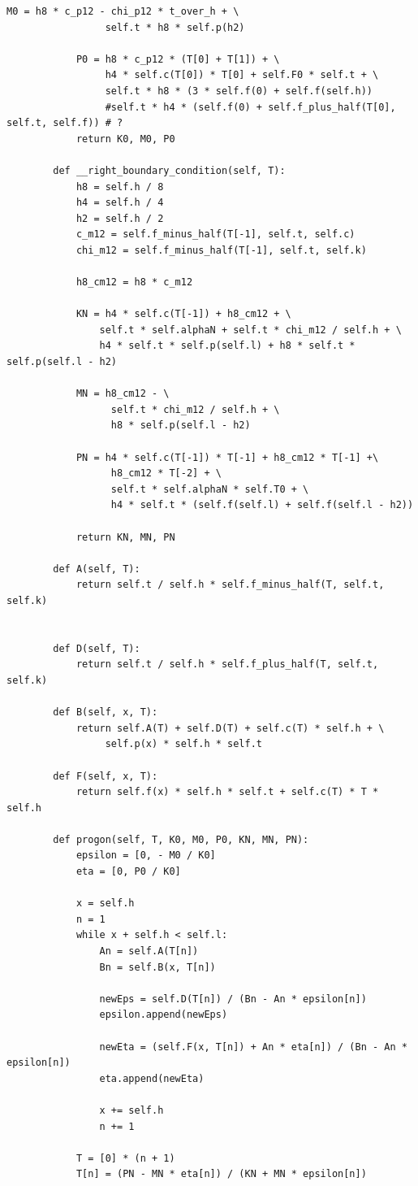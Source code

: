 \documentclass[a4paper,14pt]{article}
\begin{document}
\begin{lstlisting}[label=code1,caption=\text{Класс Modeller.}]
			M0 = h8 * c_p12 - chi_p12 * t_over_h + \
				 self.t * h8 * self.p(h2)
	
			P0 = h8 * c_p12 * (T[0] + T[1]) + \
				 h4 * self.c(T[0]) * T[0] + self.F0 * self.t + \
				 self.t * h8 * (3 * self.f(0) + self.f(self.h))
				 #self.t * h4 * (self.f(0) + self.f_plus_half(T[0], self.t, self.f)) # ?
			return K0, M0, P0
	
		def __right_boundary_condition(self, T):
			h8 = self.h / 8
			h4 = self.h / 4
			h2 = self.h / 2
			c_m12 = self.f_minus_half(T[-1], self.t, self.c)
			chi_m12 = self.f_minus_half(T[-1], self.t, self.k)
	
			h8_cm12 = h8 * c_m12 
	
			KN = h4 * self.c(T[-1]) + h8_cm12 + \
				self.t * self.alphaN + self.t * chi_m12 / self.h + \
				h4 * self.t * self.p(self.l) + h8 * self.t * self.p(self.l - h2)
			
			MN = h8_cm12 - \
				  self.t * chi_m12 / self.h + \
				  h8 * self.p(self.l - h2)
				
			PN = h4 * self.c(T[-1]) * T[-1] + h8_cm12 * T[-1] +\
				  h8_cm12 * T[-2] + \
				  self.t * self.alphaN * self.T0 + \
				  h4 * self.t * (self.f(self.l) + self.f(self.l - h2))
			
			return KN, MN, PN
	
		def A(self, T):
			return self.t / self.h * self.f_minus_half(T, self.t, self.k)
	
	
		def D(self, T):
			return self.t / self.h * self.f_plus_half(T, self.t, self.k)
	
		def B(self, x, T):
			return self.A(T) + self.D(T) + self.c(T) * self.h + \
				 self.p(x) * self.h * self.t
	
		def F(self, x, T):
			return self.f(x) * self.h * self.t + self.c(T) * T * self.h
	
		def progon(self, T, K0, M0, P0, KN, MN, PN):
			epsilon = [0, - M0 / K0]
			eta = [0, P0 / K0]
	
			x = self.h
			n = 1
			while x + self.h < self.l:
				An = self.A(T[n])
				Bn = self.B(x, T[n])
	
				newEps = self.D(T[n]) / (Bn - An * epsilon[n])
				epsilon.append(newEps)
	
				newEta = (self.F(x, T[n]) + An * eta[n]) / (Bn - An * epsilon[n])
				eta.append(newEta)
	
				x += self.h
				n += 1
			
			T = [0] * (n + 1)
			T[n] = (PN - MN * eta[n]) / (KN + MN * epsilon[n])
	

\end{lstlisting}
\end{document}

